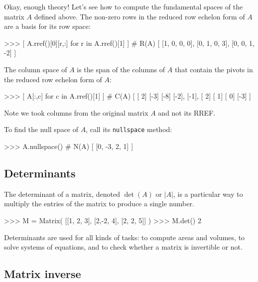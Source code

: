 Okay, enough theory! Let's see how to compute the fundamental spaces of the matrix $A$ defined above.
The non-zero rows in the reduced row echelon form of $A$ are a basis for its row space:

\small
\begin{verbatimtab}
>>> [ A.rref()[0][r,:] for r in A.rref()[1] ]       # R(A)
[  [1, 0, 0, 0],  [0, 1, 0, 3],  [0, 0, 1, -2]   ]
\end{verbatimtab}
\normalsize

\noindent
The column space of $A$ is the span of the columns of $A$ that contain the pivots
in the reduced row echelon form of $A$:



\small
\begin{verbatimtab}
>>> [ A[:,c] for c in  A.rref()[1] ]                # C(A)
[  [ 2]    [-3]   [-8]
   [-2],   [-1],  [ 2]
   [ 1]    [ 0]   [-3]  ]
\end{verbatimtab}
\normalsize

\noindent
Note we took columns from the original matrix $A$ and not its RREF.


To find the null space of $A$, call its \texttt{nullspace} method:

\small
\begin{verbatimtab}
>>> A.nullspace()                                   # N(A)
[  [0, -3, 2, 1]  ]
\end{verbatimtab}
\normalsize
\subsection{Determinants}
\label{matrices:determinants}

The determinant of a matrix, 
denoted $\det(A)$ or $|A|$, 
is a particular way to multiply the entries of the matrix to produce a single number.



\small
\begin{verbatimtab}
>>> M = Matrix( [[1, 2, 3], 
                 [2,-2, 4],
                 [2, 2, 5]] )
>>> M.det()   
2
\end{verbatimtab}
\normalsize

\noindent
Determinants are used for all kinds of tasks:
to compute areas and volumes,
to solve systems of equations, 
and to check whether a matrix is invertible or not.

\subsection{Matrix inverse}
\label{matrices:matrix_inverse}

